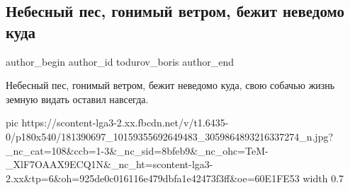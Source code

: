  
 
 
 
 
 
\subsection{Небесный пес, гонимый ветром, бежит неведомо куда}
\label{sec:14_06_2021.fb.todurov_boris.1.nebesnyj_pes_nebo_foto}
\ifcmt
 author_begin
   author_id todurov_boris
 author_end
\fi

Небесный пес, гонимый ветром, бежит неведомо куда, свою собачью жизнь земную
видать оставил навсегда.

\ifcmt
  pic https://scontent-lga3-2.xx.fbcdn.net/v/t1.6435-0/p180x540/181390697_10159355692649483_3059864893216337274_n.jpg?_nc_cat=108&ccb=1-3&_nc_sid=8bfeb9&_nc_ohc=TeM-_XlF7OAAX9ECQ1N&_nc_ht=scontent-lga3-2.xx&tp=6&oh=925de0c016116e479dbfa1e42473f3ff&oe=60E1FE53
  width 0.7
\fi

